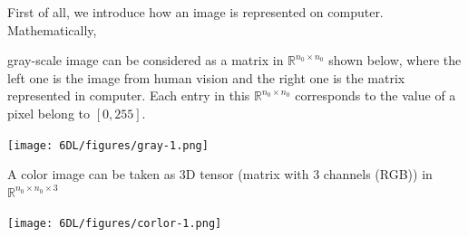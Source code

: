 First of all, we introduce how an image is represented on computer. Mathematically, {gray-scale image can be considered as a matrix  in $ \mathbb{R}^{n_0\times n_0}$ shown below, where the left one is the image from human vision and the right one is the matrix represented in computer. Each entry in this $ \mathbb{R}^{n_0\times n_0}$ corresponds to the value of a pixel belong to $[0,255]$.
	\begin{center}
		\texttt{[image: 6DL/figures/gray-1.png]}
	\end{center}
	A color image can be taken as 3D tensor (matrix with $3$ channels (RGB)) in $ \mathbb{R}^{n_0\times n_0 \times 3}$
	\begin{center}
		\texttt{[image: 6DL/figures/corlor-1.png]}
	\end{center}
	
	
	
	\break
	
}
